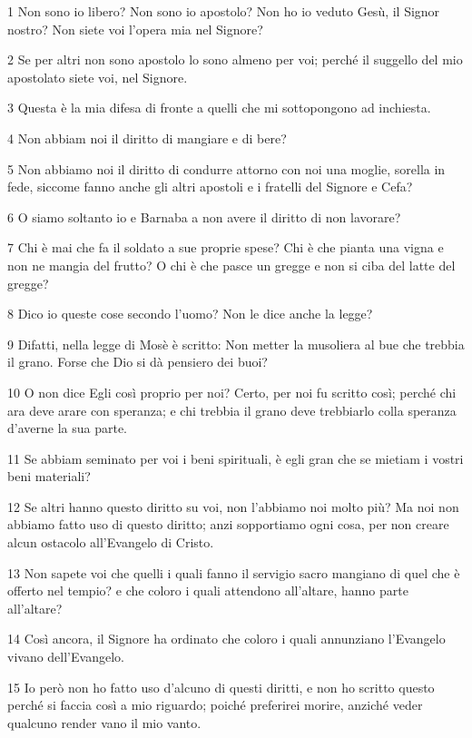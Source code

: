 \par 1 Non sono io libero? Non sono io apostolo? Non ho io veduto Gesù, il Signor nostro? Non siete voi l'opera mia nel Signore?
\par 2 Se per altri non sono apostolo lo sono almeno per voi; perché il suggello del mio apostolato siete voi, nel Signore.
\par 3 Questa è la mia difesa di fronte a quelli che mi sottopongono ad inchiesta.
\par 4 Non abbiam noi il diritto di mangiare e di bere?
\par 5 Non abbiamo noi il diritto di condurre attorno con noi una moglie, sorella in fede, siccome fanno anche gli altri apostoli e i fratelli del Signore e Cefa?
\par 6 O siamo soltanto io e Barnaba a non avere il diritto di non lavorare?
\par 7 Chi è mai che fa il soldato a sue proprie spese? Chi è che pianta una vigna e non ne mangia del frutto? O chi è che pasce un gregge e non si ciba del latte del gregge?
\par 8 Dico io queste cose secondo l'uomo? Non le dice anche la legge?
\par 9 Difatti, nella legge di Mosè è scritto: Non metter la musoliera al bue che trebbia il grano. Forse che Dio si dà pensiero dei buoi?
\par 10 O non dice Egli così proprio per noi? Certo, per noi fu scritto così; perché chi ara deve arare con speranza; e chi trebbia il grano deve trebbiarlo colla speranza d'averne la sua parte.
\par 11 Se abbiam seminato per voi i beni spirituali, è egli gran che se mietiam i vostri beni materiali?
\par 12 Se altri hanno questo diritto su voi, non l'abbiamo noi molto più? Ma noi non abbiamo fatto uso di questo diritto; anzi sopportiamo ogni cosa, per non creare alcun ostacolo all'Evangelo di Cristo.
\par 13 Non sapete voi che quelli i quali fanno il servigio sacro mangiano di quel che è offerto nel tempio? e che coloro i quali attendono all'altare, hanno parte all'altare?
\par 14 Così ancora, il Signore ha ordinato che coloro i quali annunziano l'Evangelo vivano dell'Evangelo.
\par 15 Io però non ho fatto uso d'alcuno di questi diritti, e non ho scritto questo perché si faccia così a mio riguardo; poiché preferirei morire, anziché veder qualcuno render vano il mio vanto.
